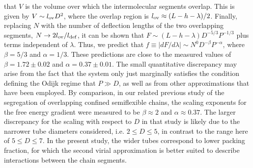 \documentclass[journal=mamobx,manuscript=article,layout=twocolumn]{achemso}
\begin{document}
that $V$ is the volume over which the intermolecular segments overlap. This is given
by $V\sim l_{\rm ov} D^2$, where the overlap region is $l_{\rm ov} \approx (L-h-\lambda)/2$.
Finally, replacing $N$ with the number of deflection lengths of the two overlapping segments,
$N\rightarrow 2l_{\rm ov}/l_{\rm def}$, it can be shown that 
$F\sim (L-h-\lambda)D^{-5/3}P^{-1/3}$ plus terms independent of $\lambda$. 
Thus, we predict that $f\equiv |dF/d\lambda| \sim N^0 D^{-\beta}P^{-\alpha}$,
where $\beta=5/3$ and $\alpha=1/3$. These predictions are close to the measured values
of $\beta=1.72\pm 0.02$ and $\alpha=0.37\pm 0.01$. The small quantitative discrepancy
may arise from the fact that the system only just marginally satisfies the condition defining 
the Odijk regime that $P\gg D$, as well as from other approximations that have been employed.
By comparison, in our related previous study of the segregation of overlapping confined 
semiflexible chains, the scaling exponents for the free energy gradient were measured to be 
$\beta\approx 2$ and $\alpha\approx 0.37$.\cite{polson2014polymer} The larger discrepancy 
for the scaling with respect to $D$ in that study is likely due to the narrower tube 
diameters considered, i.e.  $2\leq D \leq 5$, in contrast to the range here of $5\leq D \leq 7$. 
In the present study, the wider tubes correspond to lower packing fraction, for which the 
second virial approximation is better suited to describe interactions between the chain segments. 
\end{document}

